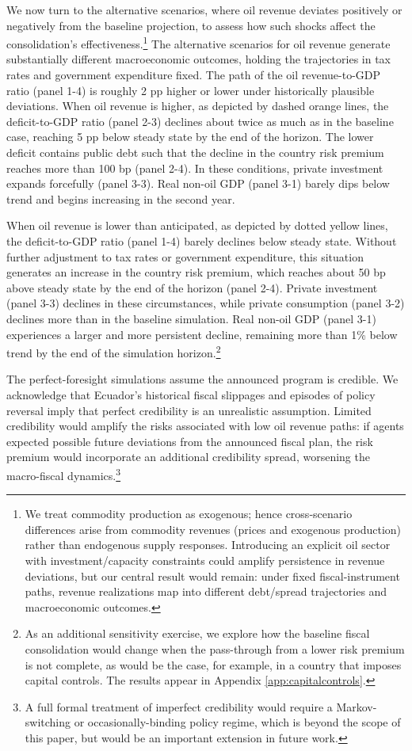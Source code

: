 \documentclass[12pt]{article}
\begin{document}
We now turn to the alternative scenarios, where oil revenue deviates positively or negatively from the baseline projection, to assess how such shocks affect the consolidation’s effectiveness.\footnote{We treat commodity production as exogenous; hence cross‑scenario differences arise from commodity revenues (prices and exogenous production) rather than endogenous supply responses. Introducing an explicit oil sector with investment/capacity constraints could amplify persistence in revenue deviations, but our central result would remain: under fixed fiscal‑instrument paths, revenue realizations map into different debt/spread trajectories and macroeconomic outcomes.} The alternative scenarios for oil revenue generate substantially different macroeconomic outcomes, holding the trajectories in tax rates and government expenditure fixed. The path of the oil revenue-to-GDP ratio (panel 1-4) is roughly 2 pp higher or lower under historically plausible deviations. When oil revenue is higher, as depicted by dashed orange lines, the deficit-to-GDP ratio (panel 2-3) declines about twice as much as in the baseline case, reaching 5 pp below steady state by the end of the horizon. The lower deficit contains public debt such that the decline in the country risk premium reaches more than 100 bp (panel 2-4). In these conditions, private investment expands forcefully (panel 3-3). Real non-oil GDP (panel 3-1) barely dips below trend and begins increasing in the second year.

When oil revenue is lower than anticipated, as depicted by dotted yellow lines, the deficit-to-GDP ratio (panel 1-4) barely declines below steady state. Without further adjustment to tax rates or government expenditure, this situation generates an increase in the country risk premium, which reaches about 50 bp above steady state by the end of the horizon (panel 2-4). Private investment (panel 3-3) declines in these circumstances, while private consumption (panel 3-2) declines more than in the baseline simulation. Real non-oil GDP (panel 3-1) experiences a larger and more persistent decline, remaining more than 1\% below trend by the end of the simulation horizon.\footnote{As an additional sensitivity exercise, we explore how the baseline fiscal consolidation would change when the pass-through from a lower risk premium is not complete, as would be the case, for example, in a country that imposes capital controls. The results appear in Appendix \ref{app:capitalcontrols}.}

The perfect-foresight simulations assume the announced program is credible. We acknowledge that Ecuador’s historical fiscal slippages and episodes of policy reversal imply that perfect credibility is an unrealistic assumption. Limited credibility would amplify the risks associated with low oil revenue paths: if agents expected possible future deviations from the announced fiscal plan, the risk premium would incorporate an additional credibility spread, worsening the macro-fiscal dynamics.\footnote{A full formal treatment of imperfect credibility would require a Markov-switching or occasionally-binding policy regime, which is beyond the scope of this paper, but would be an important extension in future work.}
\end{document}
